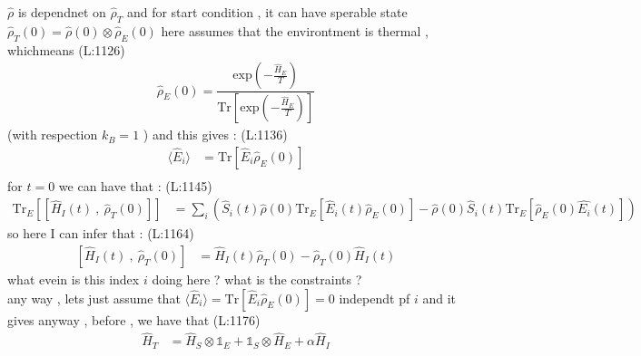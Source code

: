  $ \hat{\rho } $  is dependnet on  
 $ \hat{\rho }_{T } $  and for start condition , it can have sperable state  
 $ \hat{\rho }_{T }(0)=\hat{\rho }(0)\otimes \hat{\rho }_{E }(0) $  here assumes that the environtment is thermal , whichmeans
(L:1126)
\begin{equation}
\begin{split}
\hat{\rho }_{E }(0)=\dfrac{\text{exp}\left(-\frac{\hat{H }_{E }}{T }\right)}{\text{Tr}\left[\text{exp}\left(-\frac{\hat{H }_{E }}{T }\right)\right]}\end{split}
\end{equation}
  (with respection 
 $ k _{B }=1 $ )
 and this gives  :
(L:1136)
\begin{equation}
\begin{split}
\langle \hat{E }_{i }\rangle &=\text{Tr}\left[\hat{E }_{i }\hat{\rho }_{E }(0)\right]\\
\end{split}
\end{equation}
 for 
 $ t =0 $  we can have that :
(L:1145)
\begin{equation}
\begin{split}
\text{Tr}_{E }\left[\left[\hat{H }_{I }(t )\ ,\ \hat{\rho }_{T }(0)\right]\right]&=\sum _{i }\left(\hat{S }_{i }(t )\hat{\rho }(0)\text{Tr}_{E }\left[\hat{E }_{i }(t )\hat{\rho }_{E }(0)\right]-\hat{\rho }(0)\hat{S }_{i }(t )\text{Tr}_{E }\left[\hat{\rho }_{E }(0)\hat{E _{i }}(t )\right]\right)\end{split}
\end{equation}
 so here I can infer that : 
(L:1164)
\begin{equation}
\begin{split}
\left[\hat{H }_{I }(t )\ ,\ \hat{\rho }_{T }(0)\right]&=\hat{H }_{I }(t )\hat{\rho }_{T }(0)-\hat{\rho }_{T }(0)\hat{H }_{I }(t )\end{split}
\end{equation}
 what evein is this index
 $ i  $  doing here ? what is the constraints ? \\
 any way , lets just assume that 
 $ \langle \hat{E }_{i }\rangle =\text{Tr}\left[\hat{E }_{i }\hat{\rho }_{E }(0)\right]=0 $  independt pf
 $ i  $  and it gives  
 anyway , before , we have that  
(L:1176)
\begin{equation}
\begin{split}
\hat{H }_{T }&=\hat{H }_{S }\otimes \mathds{1}_{E }+\mathds{1}_{S }\otimes \hat{H }_{E }+\alpha \hat{H }_{I }\end{split}
\end{equation}
